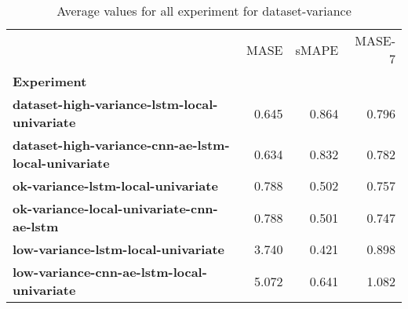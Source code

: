 \begin{table}[h]
\centering
\caption{Average values for all experiment for dataset-variance}
\label{table:Average-metric-dataset-variance}
\begin{tabular}{lrrr}
\toprule
{} &   MASE &  sMAPE &  MASE-7 \\
\textbf{Experiment                                        } &        &        &         \\
\midrule
\textbf{dataset-high-variance-lstm-local-univariate       } &  0.645 &  0.864 &   0.796 \\
\textbf{dataset-high-variance-cnn-ae-lstm-local-univariate} &  0.634 &  0.832 &   0.782 \\
\textbf{ok-variance-lstm-local-univariate                 } &  0.788 &  0.502 &   0.757 \\
\textbf{ok-variance-local-univariate-cnn-ae-lstm          } &  0.788 &  0.501 &   0.747 \\
\textbf{low-variance-lstm-local-univariate                } &  3.740 &  0.421 &   0.898 \\
\textbf{low-variance-cnn-ae-lstm-local-univariate         } &  5.072 &  0.641 &   1.082 \\
\bottomrule
\end{tabular}
\end{table}
